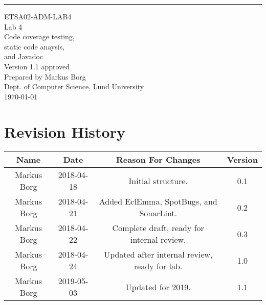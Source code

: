\documentclass{scrreprt}
\date{}
\def\myversion{1.1 }
\begin{document}
\begin{flushright}
    \rule{16cm}{5pt}\vskip1cm
    \begin{bfseries}
    	\LARGE{ETSA02-ADM-LAB4}\\
    	\vspace{1.5cm}
        \Huge{Lab 4}\\
        \vspace{0.5cm}
        Code coverage testing,\\
        \vspace{0.5cm}
        static code anaysis,\\
        \vspace{0.5cm}
        and Javadoc\\
        \vspace{1.5cm}
        \LARGE{Version \myversion approved}\\
        \vspace{1.5cm}
        Prepared by Markus Borg\\
        Dept. of Computer Science, Lund University\\
        \vspace{1.5cm}
        \today\\
    \end{bfseries}
\end{flushright}


\chapter*{Revision History}

\begin{center}
    \begin{tabular}{|c|c|c|c|}
        \hline
	    Name & Date & Reason For Changes & Version\\
        \hline
	    Markus Borg & 2018-04-18 & Initial structure. & 0.1\\
        \hline
        Markus Borg & 2018-04-21 & Added EclEmma, SpotBugs, and SonarLint. & 0.2\\
        \hline
        Markus Borg & 2018-04-22 & Complete draft, ready for internal review. & 0.3\\
        \hline
        Markus Borg & 2018-04-24 & Updated after internal review, ready for lab. & 1.0\\
        \hline
        Markus Borg & 2019-05-03 & Updated for 2019. & 1.1\\
        \hline
    \end{tabular}
\end{center}
\end{document}
